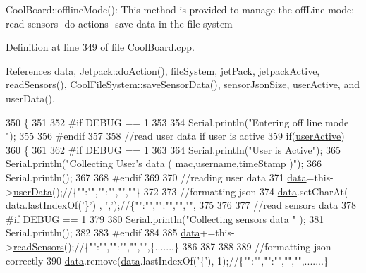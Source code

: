 Cool\+Board\+::offline\+Mode()\+: This method is provided to manage the off\+Line mode\+: -\/read sensors -\/do actions -\/save data in the file system 

Definition at line 349 of file Cool\+Board.\+cpp.



References data, Jetpack\+::do\+Action(), file\+System, jet\+Pack, jetpack\+Active, read\+Sensors(), Cool\+File\+System\+::save\+Sensor\+Data(), sensor\+Json\+Size, user\+Active, and user\+Data().


\begin{DoxyCode}
350 \{
351 
352 \textcolor{preprocessor}{#if DEBUG == 1  }
353     
354     Serial.println(\textcolor{stringliteral}{"Entering off line mode "});  
355     
356 \textcolor{preprocessor}{#endif}
357 
358     \textcolor{comment}{//read user data if user is active}
359     \textcolor{keywordflow}{if}(\hyperlink{classCoolBoard_a6395459131d6889a3005f79c7a35e964}{userActive})
360     \{
361 
362 \textcolor{preprocessor}{    #if DEBUG == 1}
363         
364         Serial.println(\textcolor{stringliteral}{"User is Active"});
365         Serial.println(\textcolor{stringliteral}{"Collecting User's data ( mac,username,timeStamp )"});
366         Serial.println();
367 
368 \textcolor{preprocessor}{    #endif}
369 
370         \textcolor{comment}{//reading user data}
371         \hyperlink{classCoolBoard_a427fb753dd8575bdf821c70a5c63d695}{data}=this->\hyperlink{classCoolBoard_ae7358fb6e623cfc81b775f5f1734909b}{userData}();\textcolor{comment}{//\{"":"","":"","",""\}}
372 
373         \textcolor{comment}{//formatting json }
374         \hyperlink{classCoolBoard_a427fb753dd8575bdf821c70a5c63d695}{data}.setCharAt( \hyperlink{classCoolBoard_a427fb753dd8575bdf821c70a5c63d695}{data}.lastIndexOf(\textcolor{charliteral}{'\}'}) , \textcolor{charliteral}{','});\textcolor{comment}{//\{"":"","":"","","",}
375         
376                 
377         \textcolor{comment}{//read sensors data}
378 \textcolor{preprocessor}{    #if DEBUG == 1}
379 
380         Serial.println(\textcolor{stringliteral}{"Collecting sensors data "} );
381         Serial.println();
382 
383 \textcolor{preprocessor}{    #endif}
384 
385         \hyperlink{classCoolBoard_a427fb753dd8575bdf821c70a5c63d695}{data}+=this->\hyperlink{classCoolBoard_ad03abdce2e65f520bbf2cff0f2d083cf}{readSensors}();\textcolor{comment}{//\{"":"","":"","","",\{.......\}}
386 
387         
388 
389         \textcolor{comment}{//formatting json correctly}
390         \hyperlink{classCoolBoard_a427fb753dd8575bdf821c70a5c63d695}{data}.remove(\hyperlink{classCoolBoard_a427fb753dd8575bdf821c70a5c63d695}{data}.lastIndexOf(\textcolor{charliteral}{'\{'}), 1);\textcolor{comment}{//\{"":"","":"","","",.......\}}

\end{DoxyCode}
